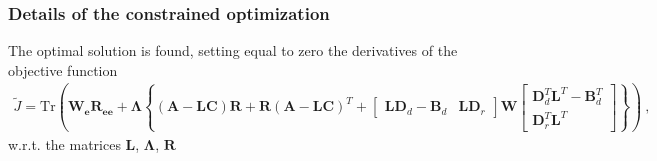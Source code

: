 \documentclass[letterpaper,10pt,english]{jupyterBook}
\begin{document}
\subsubsection*{Details of the constrained optimization}

\sphinxAtStartPar
The optimal solution is found, setting equal to zero the derivatives of the objective function
\begin{equation*}
\begin{split}\widetilde{J} = \text{Tr}\left( \mathbf{W}_{\mathbf{e}} \mathbf{R}_{\mathbf{e}\mathbf{e}} + \boldsymbol\Lambda\left\{ (\mathbf{A} - \mathbf{L}\mathbf{C}) \mathbf{R} + \mathbf{R} ( \mathbf{A} - \mathbf{L} \mathbf{C} )^T + \begin{bmatrix} \mathbf{L} \mathbf{D}_d - \mathbf{B}_d & \mathbf{L} \mathbf{D}_r \end{bmatrix} \mathbf{W} \begin{bmatrix} \mathbf{D}_d^T \mathbf{L}^T - \mathbf{B}_d^T \\ \mathbf{D}_r^T  \mathbf{L}^T \end{bmatrix}  \right\} \right) \ ,\end{split}
\end{equation*}
\sphinxAtStartPar
w.r.t. the matrices \(\mathbf{L}\), \(\boldsymbol\Lambda\), \(\mathbf{R}\)
\end{document}
